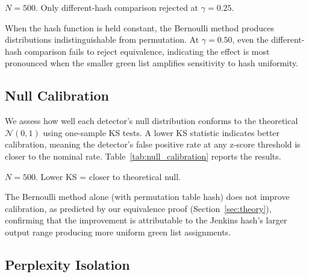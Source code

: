 \documentclass[11pt]{article}
\begin{document}
\begin{table}[!t]
\caption{Two-Sample KS Tests Isolating Hash Effect}
\label{tab:hash_attribution}
\begin{center}
\footnotesize
\resizebox{\columnwidth}{!}{}
\end{center}
\vspace{-2mm}
{\small $N=500$. Only different-hash comparison rejected at $\gamma=0.25$.}
\end{table}

When the hash function is held constant, the Bernoulli method produces distributions indistinguishable from permutation. At $\gamma=0.50$, even the different-hash comparison fails to reject equivalence, indicating the effect is most pronounced when the smaller green list amplifies sensitivity to hash uniformity.

\subsection{Null Calibration}

We assess how well each detector's null distribution conforms to the theoretical $\mathcal{N}(0,1)$ using one-sample KS tests. A lower KS statistic indicates better calibration, meaning the detector's false positive rate at any z-score threshold is closer to the nominal rate. Table~\ref{tab:null_calibration} reports the results.

\begin{table}[!t]
\caption{One-Sample KS Tests vs $\mathcal{N}(0,1)$ (Null Calibration)}
\label{tab:null_calibration}
\begin{center}
\footnotesize
\resizebox{\columnwidth}{!}{}
\end{center}
\vspace{-2mm}
{\small $N=500$. Lower KS = closer to theoretical null.}
\end{table}

The Bernoulli method alone (with permutation table hash) does not improve calibration, as predicted by our equivalence proof (Section~\ref{sec:theory}), confirming that the improvement is attributable to the Jenkins hash's larger output range producing more uniform green list assignments.

\subsection{Perplexity Isolation}
\end{document}
